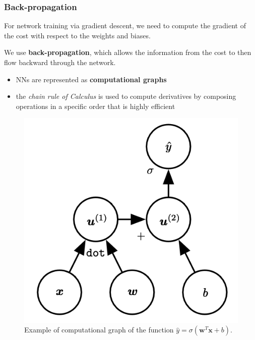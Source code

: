 \documentclass{beamer}
\begin{document}
	\begin{frame}
		\frametitle{Back-propagation}
		For network training via gradient descent, we need to compute the gradient of the cost with respect to the weights and biases.
		
		We use \textbf{back-propagation}, which allows the information from the cost to then ﬂow backward through the network.
		
		\begin{itemize}
			\item NNs are represented as \textbf{computational graphs}
			\item the \textit{chain rule of Calculus} is used to compute derivatives by composing operations in a specific order that is highly efficient
		\end{itemize}
		
		\begin{figure}
			\centering
			\includegraphics[scale=0.35]{images/graph1}
			\caption{Example of computational graph of the function $\hat{y} = \sigma(\bm{w}^T\bm{x}+b)$.}
		\end{figure}
	\end{frame}
\end{document}
